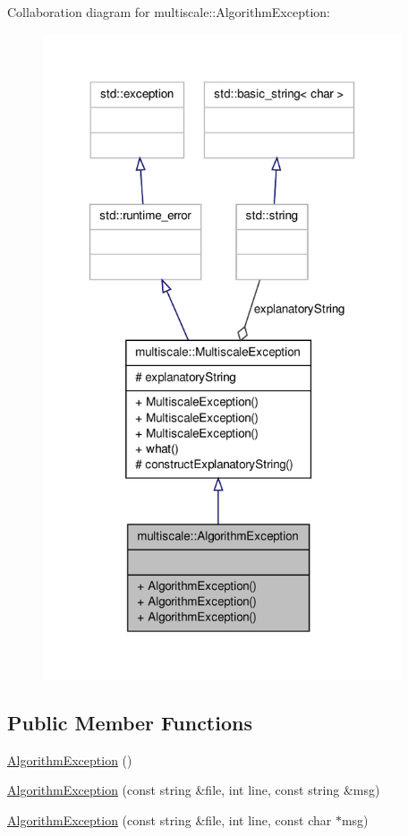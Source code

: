 \-Collaboration diagram for multiscale\-:\-:\-Algorithm\-Exception\-:
\nopagebreak
\begin{figure}[H]
\begin{center}
\leavevmode
\includegraphics[width=300pt]{classmultiscale_1_1AlgorithmException__coll__graph}
\end{center}
\end{figure}
\subsection*{\-Public \-Member \-Functions}
\begin{DoxyCompactItemize}
\item 
\hyperlink{classmultiscale_1_1AlgorithmException_a00fc60bc858418221b1159f47bfc88a4}{\-Algorithm\-Exception} ()
\item 
\hyperlink{classmultiscale_1_1AlgorithmException_a82b64c1819436f13d85f1749c6f0a9a4}{\-Algorithm\-Exception} (const string \&file, int line, const string \&msg)
\item 
\hyperlink{classmultiscale_1_1AlgorithmException_a8e93ad9821b69a6b4ac459f76b3a82ee}{\-Algorithm\-Exception} (const string \&file, int line, const char $\ast$msg)
\end{DoxyCompactItemize}



